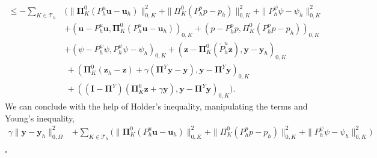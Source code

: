 \documentclass[smallextended]{svjour3}
\renewenvironment{proof}{\noindent{\it Proof.}}{\hfill$\square$}
\numberwithin{equation}{section}
\numberwithin{figure}{section}
\numberwithin{table}{section}
\newcommand\bI{\mathbf{I}}
\newcommand\bPi{\boldsymbol{\Pi}}
\newcommand{\tP}{\tilde{P}}
\newcommand\by{\boldsymbol{y}}
\newcommand\bu{\boldsymbol{u}}
\newcommand\bz{\boldsymbol{z}}
\newcommand\cT{\mathcal{T}}
\begin{document}
\begin{proof}
\begin{align*}
		\le -\sum_{K \in \cT_h} & \Big( \| \bPi^{0}_K (P_h^u \bu - \bu_h)\|_{0,K}^2 + \| \Pi^{0}_K (P_h^p p - p_h)\|_{0,K}^2 + \| P_h^\psi \psi - \psi_h \|_{0,K}^2 \\
		& + ( \bu - P_h^u \bu, \bPi^{0}_K (P_h^u \bu - \bu_h) )_{0,K} +( p- P_h^p p, \Pi^{0}_K (P_h^p p - p_h) )_{0,K} \\
		& + ( \psi- P_h^\psi \psi, P_h^\psi \psi - \psi_h )_{0,K} + (\bz - \bPi^{0}_K (\tP_h^u \bz), \by - \by_h )_{0, K}  \\
		& \, + ( \bPi^{0}_K (\bz_h- \bz) + \gamma (\bPi^Y \by - \by), \by - \bPi^Y \by )_{0, K} \\
		& \, + ( (\bI - \bPi^Y)(\bPi^{0}_K \bz + \gamma \by), \by - \bPi^Y \by )_{0, K}\Big).
	\end{align*}
	We can conclude with the help of Holder's inequality, manipulating the terms and Young's inequality,
	\begin{align*}
		\gamma \| \by - \by_h \|_{0, \Omega}^2 &+ \sum_{K \in \cT_h}  
			\Big( \| \bPi^{0}_K (P_h^u \bu - \bu_h)\|_{0,K}^2 + \| \Pi^{0}_K (P_h^p p - p_h)\|_{0,K}^2  + \| P_h^\psi \psi - \psi_h \|_{0,K}^2\Big) \\

\end{align*}
\end{proof}
\end{document}
